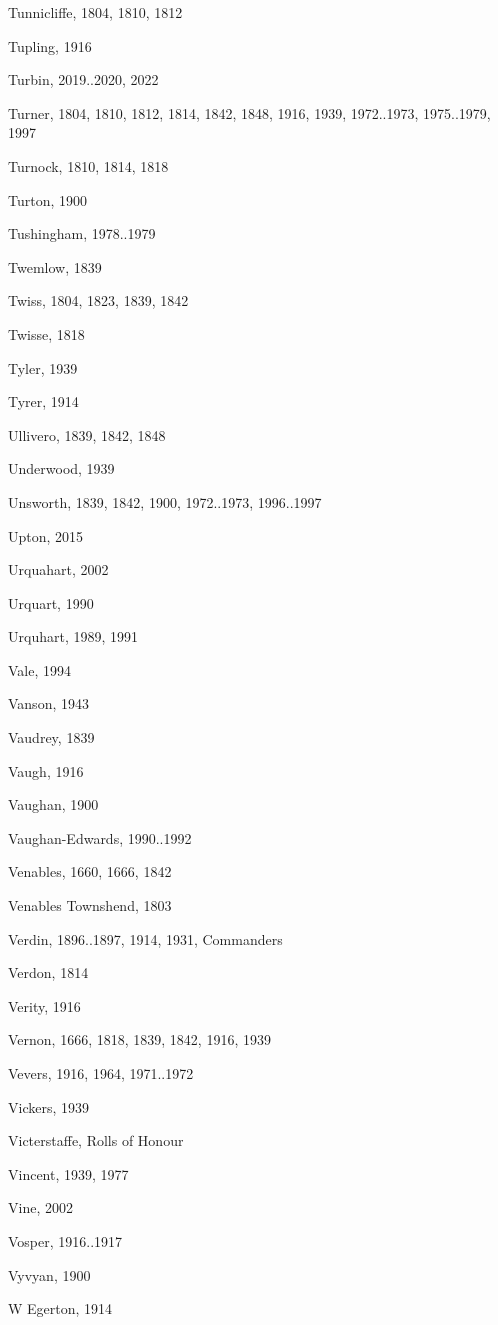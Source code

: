 {\begin{theindex}
\item Tunnicliffe, 1804, 1810, 1812
\item Tupling, 1916
\item Turbin, 2019..2020, 2022
\item Turner, 1804, 1810, 1812, 1814, 1842, 1848, 1916, 1939, 1972..1973, 1975..1979, 1997
\item Turnock, 1810, 1814, 1818
\item Turton, 1900
\item Tushingham, 1978..1979
\item Twemlow, 1839
\item Twiss, 1804, 1823, 1839, 1842
\item Twisse, 1818
\item Tyler, 1939
\item Tyrer, 1914
\item Ullivero, 1839, 1842, 1848
\item Underwood, 1939
\item Unsworth, 1839, 1842, 1900, 1972..1973, 1996..1997
\item Upton, 2015
\item Urquahart, 2002
\item Urquart, 1990
\item Urquhart, 1989, 1991
\item Vale, 1994
\item Vanson, 1943
\item Vaudrey, 1839
\item Vaugh, 1916
\item Vaughan, 1900
\item Vaughan-Edwards, 1990..1992
\item Venables, 1660, 1666, 1842
\item Venables Townshend, 1803
\item Verdin, 1896..1897, 1914, 1931, Commanders
\item Verdon, 1814
\item Verity, 1916
\item Vernon, 1666, 1818, 1839, 1842, 1916, 1939
\item Vevers, 1916, 1964, 1971..1972
\item Vickers, 1939
\item Victerstaffe, Rolls of Honour
\item Vincent, 1939, 1977
\item Vine, 2002
\item Vosper, 1916..1917
\item Vyvyan, 1900
\item W Egerton, 1914

\end{theindex}}
